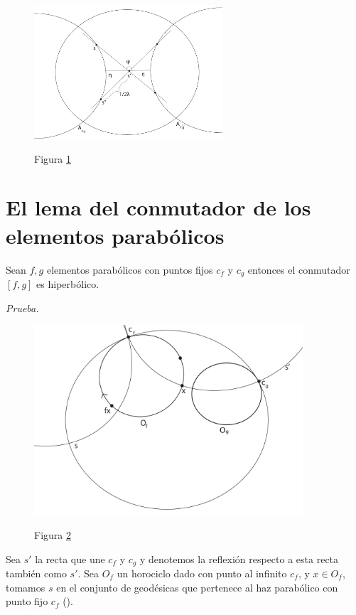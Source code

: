 \begin{figure}[h]
  \centering
  \includegraphics[width=7cm]{lemma2-dibujo4}\\
  \caption{Figura \ref{lemma2-dibujo4}}\label{lemma2-dibujo4}
\end{figure}


\section{El lema del conmutador de los elementos parab\'olicos}

\begin{lem}\label{lema3}
Sean $f,g$ elementos parab\'olicos con puntos fijos $c_{f}$ y
$c_{g}$ entonces el conmutador $[f,g]$ es hiperb\'olico.
\end{lem}

\emph{Prueba.} \\

\begin{figure}[h]
  \centering
  \includegraphics[width=10cm]{lemma3-dibujo1}\\
  \caption{Figura \ref{lemma3-dibujo1}}\label{lemma3-dibujo1}
\end{figure}


 Sea $s'$ la recta que une $c_{f}$ y $c_{g}$ y denotemos la reflexi\'on respecto a esta recta
tambi\'en como $s'$. Sea $O_{f}$ un horociclo dado con punto al
infinito $c_{f}$, y $x \in O_{f}$, tomamos $s$ en el conjunto de geod\'esicas que pertenece al haz parab\'olico con punto fijo $c_{f}$ (\cite{Beardon}).


